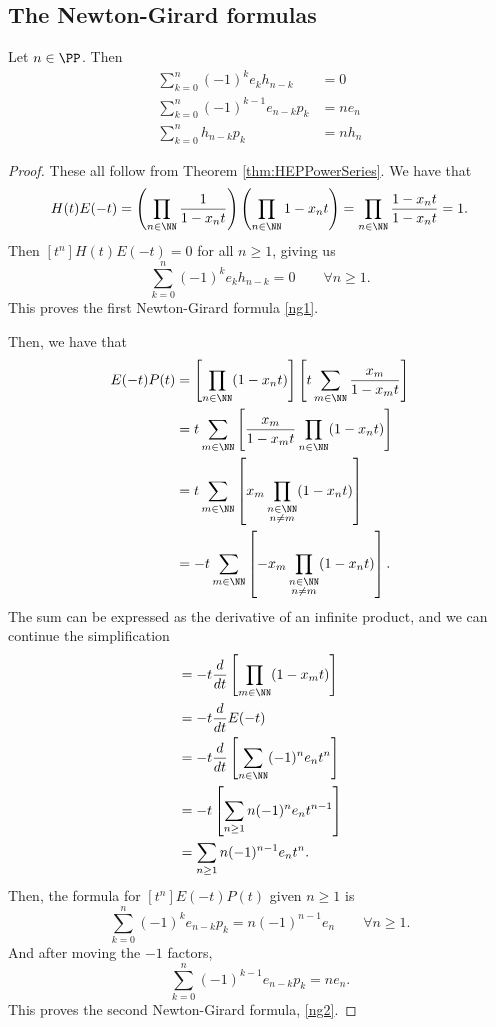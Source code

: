 \documentclass{article}
\begin{document}
\subsection{The Newton-Girard formulas}

\begin{theorem}
    Let $n \in \PP$. Then
    \begin{align}
        \sum_{k=0}^n (-1)^k e_kh_{n-k} &= 0 \label{ng1} \\
        \sum_{k=0}^n (-1)^{k-1} e_{n-k}p_k &= ne_n  \label{ng2} \\
        \sum_{k=0}^n h_{n-k}p_k &= nh_n \label{eq:ng3}
    \end{align}
\end{theorem}

\begin{proof}
    These all follow from Theorem \ref{thm:HEPPowerSeries}. We have that
    \[
        H(t)E(-t) 
        = \left(\prod_{n\in\NN}\frac{1}{1-x_nt}\right)\left(\prod_{n\in\NN}1-x_nt\right) 
        = \prod_{n\in\NN}\frac{1-x_nt}{1-x_nt} = 1.
    \]
    Then $[t^n] H(t)E(-t) = 0$ for all $n \geq 1$, giving us
    \[
        \sum_{k=0}^n (-1)^k e_k h_{n-k} = 0 \qquad \forall n\geq 1.
    \]
    This proves the first Newton-Girard formula \eqref{ng1}.

    Then, we have that
    \begin{align*}
        E(-t)P(t) &= \left[\prod_{n\in\NN}(1-x_nt)\right]\left[t\sum_{m\in\NN}\frac{x_m}{1-x_mt}\right] \\
                  &= t\sum_{m\in\NN}\left[\frac{x_m}{1-x_mt}\prod_{n\in\NN}(1-x_nt)\right] \\
                  &= t\sum_{m\in\NN} \left[x_m\prod_{\substack{n\in\NN \\ n\neq m}}(1-x_nt)\right] \\
                  &= -t\sum_{m\in\NN} \left[-x_m\prod_{\substack{n\in\NN \\ n\neq m}}(1-x_nt)\right].
    \end{align*}
    The sum can be expressed as the derivative of an infinite product, and we can continue the simplification
    \begin{align*}
                  &= -t\frac{d}{dt}\left[\prod_{m\in\NN}(1-x_mt)\right] \\
                  &= -t\frac{d}{dt}E(-t) \\
                  &= -t\frac{d}{dt}\left[\sum_{n\in\NN}(-1)^n e_nt^n\right] \\
                  &= -t\left[\sum_{n\geq 1}n(-1)^n e_nt^{n-1}\right] \\
                  &= \sum_{n\geq 1}n(-1)^{n-1} e_nt^n.
    \end{align*}
    Then, the formula for $[t^n]E(-t)P(t)$ given $n \geq 1$ is
    \[
        \sum_{k=0}^n (-1)^k e_{n-k}p_k = n(-1)^{n-1}e_n \qquad \forall n \geq 1.
    \]
    And after moving the $-1$ factors,
    \[
        \sum_{k=0}^n (-1)^{k-1} e_{n-k}p_k = ne_n.
    \]
    This proves the second Newton-Girard formula, \eqref{ng2}.


\end{proof}
\end{document}
